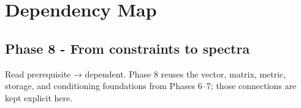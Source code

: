 \hypertarget{appendix-4ad47bdd269a}{}\label{referencestart:appendix-4ad47bdd269a}
\section{Dependency Map}\label{appendix-4ad47bdd269a-dependency-map}

\hypertarget{appendix-4ad47bdd269a-dependency-map}{}

\subsection{Phase 8 - From constraints to spectra}\label{appendix-4ad47bdd269a-phase-8---from-constraints-to-spectra}

\hypertarget{appendix-4ad47bdd269a-phase-8---from-constraints-to-spectra}{}

Read prerequisite → dependent. Phase 8 reuses the vector, matrix, metric, storage, and conditioning foundations from Phases 6--7; those connections are kept explicit here.

